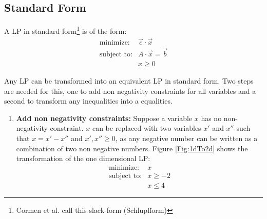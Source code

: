 \begin{pr}
\subsection*{Standard Form}\label{Sec:standardForm}
A LP in standard form\footnote{Cormen et al. call this slack-form (Schlupfform)} is of the form:
\begin{eqnarray*}
\text{minimize:}& \vec c \cdot \vec x \\
\text{subject to:} & A \cdot \vec x = \vec b \\
& x\geq0
\end{eqnarray*}

Any LP can be transformed into an equivalent LP in standard form. Two steps are needed for this, one to add non negativity constraints for all variables and a second to transform any inequalities into a equalities.

\begin{enumerate}
\item {\bfseries Add non negativity constraints:} Suppose a variable $x$ has no non-negativity constraint. $x$ can be replaced with two variables $x'$ and $x''$ such that $x=x'-x''$ and $x',x''\geq 0$, as any negative number can be written as a combination of two non negative numbers. Figure \ref{Fig:1dTo2d} shows the transformation of the one dimensional LP:
\begin{eqnarray*}
\text{minimize:}& x \\
\text{subject to:} & x \geq -2\\
& x \leq 4
\end{eqnarray*}


\end{enumerate}
\end{pr}
